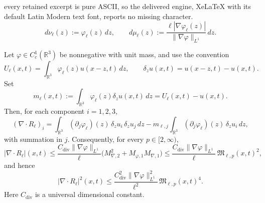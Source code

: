 \documentclass[10pt,a4paper]{amsart}
\newcommand{\R}{\mathbb R}
\begin{document}
every retained excerpt is pure ASCII, so the delivered engine, XeLaTeX with its default Latin Modern text font, reports no missing character.
\begin{equation}\label{eq:nu-mu-def}
d\nu_\ell(z):=\varphi_\ell(z)\,dz,
\qquad
 d\mu_\ell(z):=
\frac{\ell|\nabla\varphi_\ell(z)|}{\|\nabla\varphi\|_{L^1}}\,dz.
\end{equation}

\begin{lemma}\label{lem:increment-divR}
Let $\varphi\in C_c^1(\R^3)$ be nonnegative with unit mass, and use the convention
\[
U_\ell(x,t)=\int_{\R^3}\varphi_\ell(z)u(x-z,t)\,dz,
\qquad
\delta_z u(x,t)=u(x-z,t)-u(x,t).
\]
Set
\[
m_\ell(x,t):=\int_{\R^3}\varphi_\ell(z)\delta_z u(x,t)\,dz=U_\ell(x,t)-u(x,t).
\]
Then, for each component $i=1,2,3$,
\begin{equation}\label{eq:divR-increment-identity}
(\nabla\!\cdot R_\ell)_i
=
\int_{\R^3}(\partial_j\varphi_\ell)(z)\,\delta_z u_i\,\delta_z u_j\,dz
-
 m_{\ell,j}\int_{\R^3}(\partial_j\varphi_\ell)(z)\,\delta_z u_i\,dz,
\end{equation}
with summation in $j$.  Consequently, for every $p\in[2,\infty)$,
\begin{equation}\label{eq:pointwise-divR-compatible}
|\nabla\!\cdot R_\ell|(x,t)
\le
\frac{C_{\mathrm{div}}\|\nabla\varphi\|_{L^1}}{\ell}
\bigl(M_{\nabla,2}^2+M_{\varphi,1}M_{\nabla,1}\bigr)
\le
\frac{C_{\mathrm{div}}\|\nabla\varphi\|_{L^1}}{\ell}\,\mathfrak M_{\ell,p}(x,t)^2,
\end{equation}
and hence
\begin{equation}\label{eq:pointwise-divR-p}
|\nabla\!\cdot R_\ell|^2(x,t)
\le
\frac{C_{\mathrm{div}}^2\|\nabla\varphi\|_{L^1}^2}{\ell^2}\,
\mathfrak M_{\ell,p}(x,t)^4.
\end{equation}
Here $C_{\mathrm{div}}$ is a universal dimensional constant.
\end{lemma}
\end{document}
